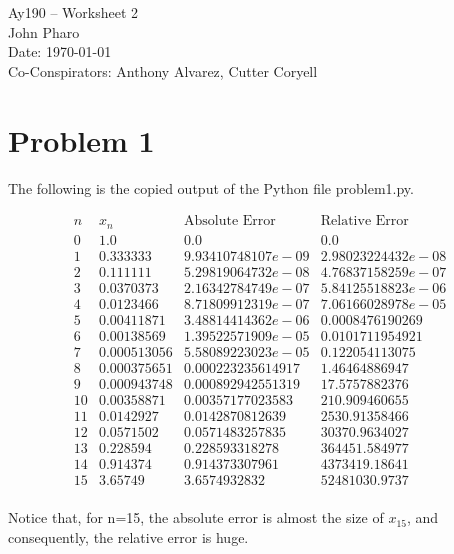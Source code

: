 \documentclass[11pt,letterpaper]{article}
\begin{document}
\begin{center}
\Large
Ay190 -- Worksheet 2\\
John Pharo\\
Date: \today \\
Co-Conspirators: Anthony Alvarez, Cutter Coryell
\end{center}

\section*{Problem 1}

The following is the copied output of the Python file problem1.py.

\[
\begin{array}{lllllllllllllllll}
n & x_n & \text{Absolute Error} & \text{Relative Error} \\
0 & 1.0 & 0.0 & 0.0 \\ 
1 & 0.333333 & 9.93410748107e-09 & 2.98023224432e-08 \\ 
2 & 0.111111 & 5.29819064732e-08 & 4.76837158259e-07 \\ 
3 & 0.0370373 & 2.16342784749e-07 & 5.84125518823e-06 \\ 
4 & 0.0123466 & 8.71809912319e-07 & 7.06166028978e-05 \\ 
5 & 0.00411871 & 3.48814414362e-06 & 0.0008476190269 \\ 
6 & 0.00138569 & 1.39522571909e-05 & 0.0101711954921 \\ 
7 & 0.000513056 & 5.58089223023e-05 & 0.122054113075 \\ 
8 & 0.000375651 & 0.000223235614917 & 1.46464886947 \\ 
9 & 0.000943748 & 0.000892942551319 & 17.5757882376 \\ 
10 & 0.00358871 & 0.00357177023583 & 210.909460655 \\ 
11 & 0.0142927 & 0.0142870812639 & 2530.91358466 \\ 
12 & 0.0571502 & 0.0571483257835 & 30370.9634027 \\ 
13 & 0.228594 & 0.228593318278 & 364451.584977 \\ 
14 & 0.914374 & 0.914373307961 & 4373419.18641 \\ 
15 & 3.65749 & 3.6574932832 & 52481030.9737 \\ 
\end{array}
\]

Notice that, for n=15, the absolute error is almost the size of $x_{15}$, and consequently, the relative error is huge.
\end{document}
